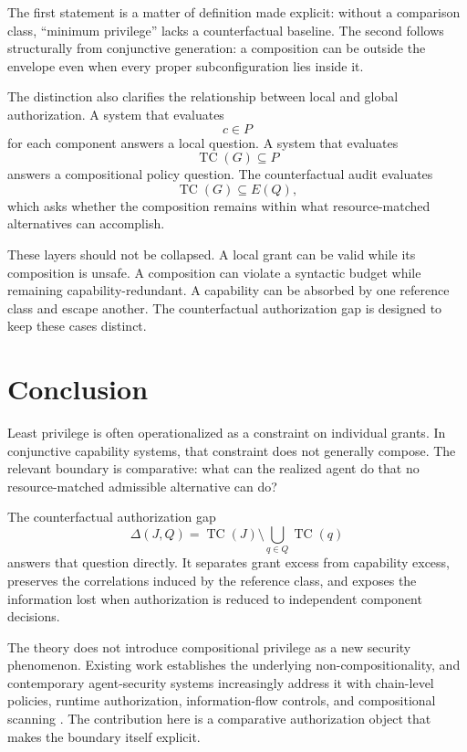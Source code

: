 \documentclass[11pt]{article}
\newcommand{\TC}{\operatorname{TC}}
\begin{document}
The first statement is a matter of definition made explicit: without a comparison class, ``minimum privilege'' lacks a counterfactual baseline. The second follows structurally from conjunctive generation: a composition can be outside the envelope even when every proper subconfiguration lies inside it.

The distinction also clarifies the relationship between local and global authorization. A system that evaluates
\[
c\in P
\]
for each component answers a local question. A system that evaluates
\[
\TC(G)\subseteq P
\]
answers a compositional policy question. The counterfactual audit evaluates
\[
\TC(G)\subseteq E(Q),
\]
which asks whether the composition remains within what resource-matched alternatives can accomplish.

These layers should not be collapsed. A local grant can be valid while its composition is unsafe. A composition can violate a syntactic budget while remaining capability-redundant. A capability can be absorbed by one reference class and escape another. The counterfactual authorization gap is designed to keep these cases distinct.

\section{Conclusion}

Least privilege is often operationalized as a constraint on individual grants. In conjunctive capability systems, that constraint does not generally compose. The relevant boundary is comparative: what can the realized agent do that no resource-matched admissible alternative can do?

The counterfactual authorization gap
\[
\Delta(J,Q)=\TC(J)\setminus\bigcup_{q\in Q}\TC(q)
\]
answers that question directly. It separates grant excess from capability excess, preserves the correlations induced by the reference class, and exposes the information lost when authorization is reduced to independent component decisions.

The theory does not introduce compositional privilege as a new security phenomenon. Existing work establishes the underlying non-compositionality, and contemporary agent-security systems increasingly address it with chain-level policies, runtime authorization, information-flow controls, and compositional scanning \cite{spera2026,campbell2026,wang2026,schneider2026,ji2026,zhu2026}. The contribution here is a comparative authorization object that makes the boundary itself explicit.
\end{document}
